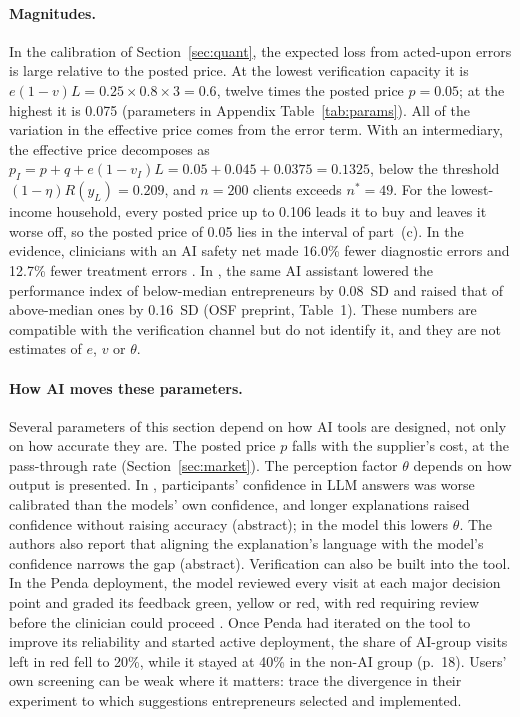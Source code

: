 \documentclass[12pt]{article}
\theoremstyle{remark}
\begin{document}
\paragraph{Magnitudes.} In the calibration of Section~\ref{sec:quant}, the expected loss from acted-upon errors is large relative to the posted price. At the lowest verification capacity it is $e(1-v)L=0.25\times0.8\times3=0.6$, twelve times the posted price $p=0.05$; at the highest it is 0.075 (parameters in Appendix Table~\ref{tab:params}). All of the variation in the effective price comes from the error term. With an intermediary, the effective price decomposes as $p_I=p+q+e(1-v_I)L=0.05+0.045+0.0375=0.1325$, below the threshold $(1-\eta)R(y_L)=0.209$, and $n=200$ clients exceeds $n^*=49$. For the lowest-income household, every posted price up to 0.106 leads it to buy and leaves it worse off, so the posted price of 0.05 lies in the interval of part~(c). In the evidence, clinicians with an AI safety net made 16.0\% fewer diagnostic errors and 12.7\% fewer treatment errors \citep[Table~3, p.~16]{korom2025penda}. In \citet{otis2026uneven}, the same AI assistant lowered the performance index of below-median entrepreneurs by 0.08~SD and raised that of above-median ones by 0.16~SD (OSF preprint, Table~1). These numbers are compatible with the verification channel but do not identify it, and they are not estimates of $e$, $v$ or $\theta$.

\paragraph{How AI moves these parameters.} Several parameters of this section depend on how AI tools are designed, not only on how accurate they are. The posted price $p$ falls with the supplier's cost, at the pass-through rate (Section~\ref{sec:market}). The perception factor $\theta$ depends on how output is presented. In \citet[arXiv v2, pp.~12--13]{steyvers2025know}, participants' confidence in LLM answers was worse calibrated than the models' own confidence, and longer explanations raised confidence without raising accuracy (abstract); in the model this lowers $\theta$. The authors also report that aligning the explanation's language with the model's confidence narrows the gap (abstract). Verification can also be built into the tool. In the Penda deployment, the model reviewed every visit at each major decision point and graded its feedback green, yellow or red, with red requiring review before the clinician could proceed \citep[p.~5]{korom2025penda}. Once Penda had iterated on the tool to improve its reliability and started active deployment, the share of AI-group visits left in red fell to 20\%, while it stayed at 40\% in the non-AI group (p.~18). Users' own screening can be weak where it matters: \citet[p.~4]{otis2026uneven} trace the divergence in their experiment to which suggestions entrepreneurs selected and implemented.
\end{document}

